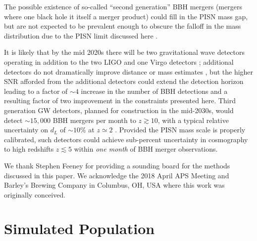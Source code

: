 \documentclass[modern]{aastex62}
\begin{document}
The possible existence of so-called ``second generation'' \ac{BBH} mergers
(mergers where one black hole it itself a merger product) could fill in the
\ac{PISN} mass gap, but are not expected to be prevalent enough to obscure the
falloff in the mass distribution due to the \ac{PISN} limit discussed here
\citep{Rodriguez2019}.

It is likely that by the mid 2020s there will be two gravitational wave
detectors operating in addition to the two LIGO and one Virgo detectors
\cite{ObsScenarios}; additional detectors do not dramatically improve distance
or mass estimates \citep{Vitale2017}, but the higher SNR afforded from the
additional detectors could extend the detection horizon leading to a factor of
$\sim 4$ increase in the number of \ac{BBH} detections and a resulting factor of
two improvement in the constraints presented here.  Third generation \ac{GW}
detectors, planned for construction in the mid-2030s, would detect $\sim 15,000$
\ac{BBH} mergers per month to $z \gtrsim 10$, with a typical relative
uncertainty on $d_L$ of $\sim 10 \%$ at $z \simeq 2$ \citep{Vitale2018}.
Provided the \ac{PISN} mass scale is properly calibrated, such detectors could
achieve sub-percent uncertainty in cosmography to high redshifts $z \lesssim 5$
within \emph{one month} of \ac{BBH} merger observations.

\acknowledgments

We thank Stephen Feeney for providing a sounding board for the methods discussed
in this paper.  We acknowledge the 2018 April APS Meeting and Barley's Brewing
Company in Columbus, OH, USA where this work was originally conceived.



\appendix

\setcounter{figure}{0}
\renewcommand{\figurename}{Extended Data Figure}
\renewcommand{\tablename}{Extended Data Table}

\section{Simulated Population}
\label{sec:simulated-population}
\end{document}
